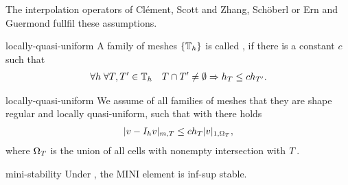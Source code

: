 \begin{remark}
  The interpolation operators of Clément, Scott and Zhang, Schöberl or
  Ern and Guermond fullfil these assumptions.
\end{remark}

\begin{Definition}{locally-quasi-uniform}
  A family of meshes $\{\mathbb T_h\}$ is called , if there is a constant $c$ such that
  \begin{gather}
    \label{eq:stokes:14}
    \forall h
    \;
    \forall T,T'\in \mathbb T_h
    \quad
    T\cap T'\neq \emptyset
    \Rightarrow
    h_T \le c h_{T'}.
  \end{gather}
\end{Definition}

\begin{Assumption}{locally-quasi-uniform}
  We assume of all families of meshes that they are shape regular and
  locally quasi-uniform, such that with
   there holds
  \begin{gather}
    \label{eq:stokes:15}
    \lvert v-I_h v\rvert_{m,T} \le c h_T \lvert v\rvert_{1,\Omega_T},
  \end{gather}
  where $\Omega_T$ is the union of all cells with nonempty
  intersection with $T$.
\end{Assumption}

\begin{Theorem}{mini-stability}
  Under ,
  the MINI element is inf-sup stable.
\end{Theorem}

